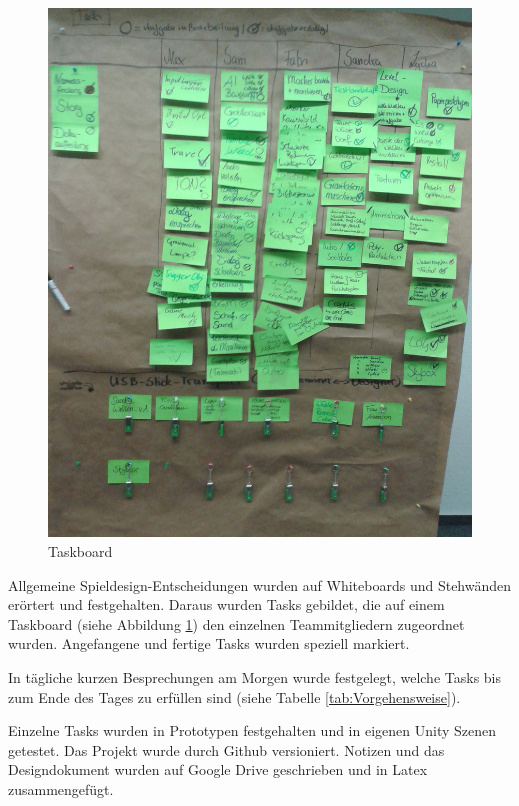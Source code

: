 
\begin{figure}[!htbp]
	\centering
		\includegraphics[width=1.0\textwidth]{images/Tasks}
	\caption{Taskboard}
	\label{fig:Tasks}
\end{figure}

Allgemeine Spieldesign-Entscheidungen wurden auf Whiteboards und Stehwänden erörtert und festgehalten. Daraus wurden Tasks gebildet, die auf einem Taskboard (siehe Abbildung \ref{fig:Tasks}) den einzelnen Teammitgliedern zugeordnet wurden. Angefangene und fertige Tasks wurden speziell markiert.

In tägliche kurzen Besprechungen am Morgen wurde festgelegt, welche Tasks bis zum Ende des Tages zu erfüllen sind (siehe Tabelle \ref{tab:Vorgehensweise}).

Einzelne Tasks wurden in Prototypen festgehalten und in eigenen Unity Szenen getestet. Das Projekt wurde durch Github versioniert. Notizen und das Designdokument wurden auf Google Drive geschrieben und in Latex zusammengefügt.

